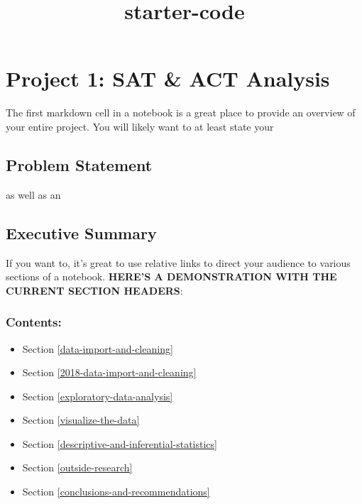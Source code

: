 \documentclass[11pt]{article}
\title{starter-code}
\providecommand{\tightlist}{%
      \setlength{\itemsep}{0pt}\setlength{\parskip}{0pt}}
\begin{document}
    
    
    \maketitle
    
    

    
    \section{Project 1: SAT \& ACT
Analysis}\label{project-1-sat-act-analysis}

    The first markdown cell in a notebook is a great place to provide an
overview of your entire project. You will likely want to at least state
your

\subsection{Problem Statement}\label{problem-statement}

    as well as an

    \subsection{Executive Summary}\label{executive-summary}

If you want to, it's great to use relative links to direct your audience
to various sections of a notebook. \textbf{HERE'S A DEMONSTRATION WITH
THE CURRENT SECTION HEADERS}:

\subsubsection{Contents:}\label{contents}

\begin{itemize}
\tightlist
\item
  Section \ref{data-import-and-cleaning}
\item
  Section \ref{2018-data-import-and-cleaning}
\item
  Section \ref{exploratory-data-analysis}
\item
  Section \ref{visualize-the-data}
\item
  Section \ref{descriptive-and-inferential-statistics}
\item
  Section \ref{outside-research}
\item
  Section \ref{conclusions-and-recommendations}
\end{itemize}
\end{document}
